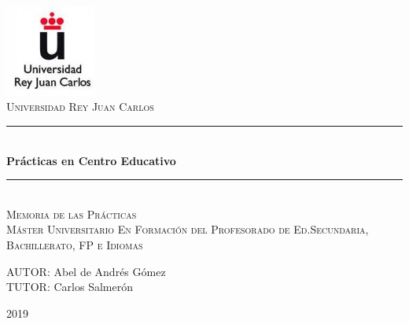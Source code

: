 \documentclass[spanish,12pt, a4paper,twoside]{paper}
\begin{document}
\begin{titlepage}

\newcommand{\HRule}{\rule{\linewidth}{0.5mm}} %

\renewcommand{\baselinestretch}{1.5}

\center %
 
  \hspace{9cm}
\includegraphics[width=3cm]{recursos/logo_urjc.jpg}
\\[2cm]

\textsc{\large Universidad Rey Juan Carlos }
\\[3cm]


 \HRule \\[0.4cm]
{ \huge \bfseries Prácticas en Centro Educativo}\\[0.4cm] %
\HRule \\[2.5cm]

\textsc{\LARGE Memoria de las Prácticas}\\[0.5cm] 
\textsc{\Large Máster Universitario En Formación del Profesorado de Ed.Secundaria, Bachillerato, FP e Idiomas }\\[2.5cm]

\begin{flushright}
\large
AUTOR: Abel de Andrés Gómez\\
TUTOR: Carlos Salmerón\linebreak
\end{flushright}

\vspace{1.3cm}

{ {2019}}\\[3cm]

\vfill %

\end{titlepage}
\end{document}
